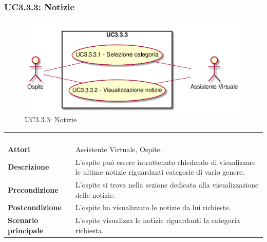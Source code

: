 \newpage\subsubsection{UC3.3.3: Notizie}
\label{UC3.3.3}
\begin{figure}[h]
\centering
\includegraphics[width=\textwidth,height=\textheight,keepaspectratio]{images/UseCaseUC333.png}
\caption{UC3.3.3: Notizie}
\end{figure}
\begin{longtable}{l|p{10cm}}
\rowcolor[gray]{0.8} \multicolumn{2}{c}{} \\
\rowcolor[gray]{0.8} \multicolumn{2}{c}{\textbf{UC3.3.3 - Notizie}} \\
\rowcolor[gray]{0.8} \multicolumn{2}{c}{} \\
\hline
&\\
\textbf{Attori} & Assistente Virtuale, Ospite.\\[7pt]
\textbf{Descrizione} & L'ospite può essere intrattenuto chiedendo di visualizzare le ultime notizie riguardanti categorie di vario genere.\\[7pt]
\textbf{Precondizione} & L'ospite si trova nella sezione dedicata alla visualizzazione delle notizie.\\[7pt]
\textbf{Postcondizione} & L'ospite ha visualizzato le notizie da lui richieste.\\[7pt]
\textbf{Scenario principale} &L'ospite visualizza le notizie riguardanti la categoria richiesta.\\[7pt]\hline
\end{longtable}

